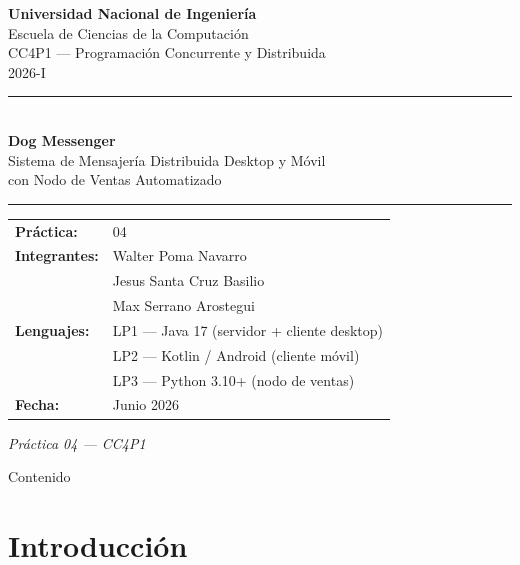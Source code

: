 \documentclass[aspectratio=169,14pt]{beamer}
\begin{document}
\begin{frame}
\centering
\vspace*{0.3cm}

{\Large \textbf{Universidad Nacional de Ingeniería}}\\[0.2cm]
{\large Escuela de Ciencias de la Computación}\\[0.1cm]
{\large CC4P1 --- Programación Concurrente y Distribuida}\\[0.1cm]
{\large 2026-I}

\vspace{0.8cm}
\rule{\linewidth}{1.5pt}\\[0.3cm]
{\LARGE \textbf{Dog Messenger}}\\[0.2cm]
{\large Sistema de Mensajería Distribuida Desktop y Móvil}\\[0.1cm]
{\large con Nodo de Ventas Automatizado}
\rule{\linewidth}{1.5pt}

\vspace{0.6cm}

\begin{tabular}{ll}
\textbf{Práctica:}    & 04 \\[4pt]
\textbf{Integrantes:} & Walter Poma Navarro \\
                      & Jesus Santa Cruz Basilio\\
                      & Max Serrano Arostegui\\[4pt]
\textbf{Lenguajes:}   & LP1 --- Java 17 (servidor + cliente desktop) \\
                      & LP2 --- Kotlin / Android (cliente móvil) \\
                      & LP3 --- Python 3.10+ (nodo de ventas) \\[4pt]
\textbf{Fecha:}       & Junio 2026 \\
\end{tabular}

\vfill
\small
\textit{Práctica 04 --- CC4P1}
\end{frame}

\begin{frame}{Contenido}
\tableofcontents
\end{frame}

\section{Introducción}
\end{document}
